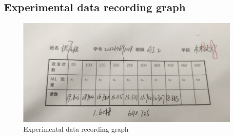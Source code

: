 \documentclass[UTF8]{article}
\begin{document}
\begin{appendix}
 \section{Experimental data recording graph} 
     	 \begin{figure}[h]
     	     \centering
     	     \includegraphics[width=0.8\linewidth]{FIG10.png}
     	     \caption{Experimental data recording graph}
     	     \label{fig:enter-label}
     	 \end{figure}
 \end{appendix} 

	
	
	
\end{document}

